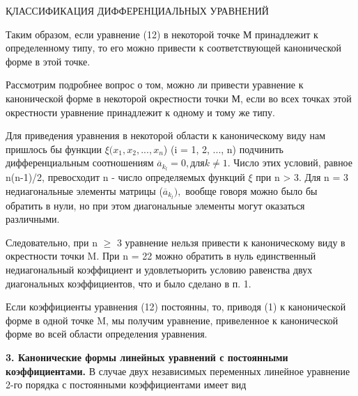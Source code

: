 \documentclass{article}
\begin{document}
\begin{center}
\footnotesize{}
ҚЛАССИФИКАЦИЯ ДИФФЕРЕНЦИАЛЬНЫХ УРАВНЕНИЙ
\end{center}
Таким образом, если уравнение (12) в некоторой точке М
принадлежит к определенному типу, то его можно привести к
соответствующей канонической форме в этой точке.

Рассмотрим подробнее вопрос о том, можно ли привести
уравнение к канонической форме в некоторой окрестности точки
М, если во всех точках этой окрестности уравнение принадлежит к одному и тому же типу.

Для приведения уравнения в некоторой области к каноническому виду нам пришлось бы функции $\xi(x_1, x_2, ..., x_n$) (i = 1, 2, ..., n) подчинить дифференциальным соотношениям $ \overline{a}_k_l = 0, для k \neq 1.$ Число этих условий, равное n(n-1)/2, превосходит n - число определяемых функций $\xi$ при n > 3.  Для n = 3  недиагональные элементы матрицы ($\overline{a}_k_l),$ вообще говоря можно было бы обратить в нули, но при этом диагональные элементы могут оказаться различными.

Следовательно, при n $\geq$ 3 уравнение нельзя привести к каноническому виду в окрестности точки M. При n = 22 можно обратить в нуль единственный недиагональный коэффициент и удовлетыорить условию равенства двух диагональных коэффициентов, что и было сделано в п. 1.

Если коэффициенты уравнения (12) постоянны, то, приводя (1) к канонической форме в одной точке M, мы получим уравнение, привеленное к канонической форме во всей области определения уравнения.

\textbf{3. Канонические формы линейных уравнений с постоянными коэффициентами.} В случае двух независимых переменных линейное уравнение 2-го порядка с постоянными коэффициентами имеет вид 
\end{document}
